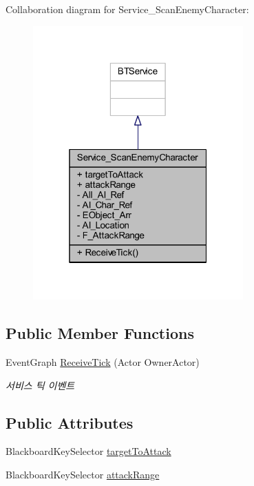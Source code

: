 Collaboration diagram for Service\+\_\+\+Scan\+Enemy\+Character\+:
\nopagebreak
\begin{figure}[H]
\begin{center}
\leavevmode
\includegraphics[width=229pt]{class_service___scan_enemy_character__coll__graph}
\end{center}
\end{figure}
\subsection*{Public Member Functions}
\begin{DoxyCompactItemize}
\item 
Event\+Graph \hyperlink{class_service___scan_enemy_character_a66151b657f1393da679331e72c10336f}{Receive\+Tick} (Actor Owner\+Actor)
\begin{DoxyCompactList}\small\item\em 서비스 틱 이벤트 \end{DoxyCompactList}\end{DoxyCompactItemize}
\subsection*{Public Attributes}
\begin{DoxyCompactItemize}
\item 
Blackboard\+Key\+Selector \hyperlink{class_service___scan_enemy_character_a5bfdf42c8b2b4cf0626be2e66d0872c9}{target\+To\+Attack}
\item 
Blackboard\+Key\+Selector \hyperlink{class_service___scan_enemy_character_a979c3edbb893577752b48933d3a92271}{attack\+Range}
\end{DoxyCompactItemize}
